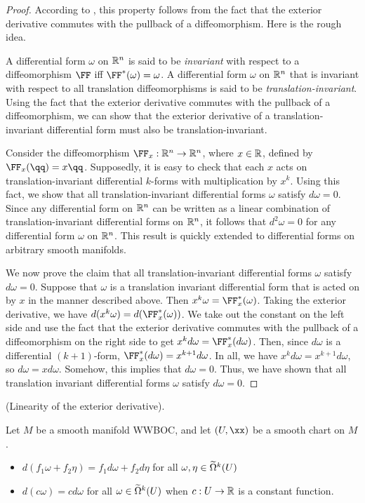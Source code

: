 \begin{proof}
    According to \cite{StackExchangePullbackImpliesdd0}, this property follows from the fact that the exterior derivative commutes with the pullback of a diffeomorphism. Here is the rough idea.
    
    A differential form $\omega$ on $\mathbb{R}^n$ is said to be \textit{invariant} with respect to a diffeomorphism $\FF$ iff $\FF^*(\omega) = \omega$. A differential form $\omega$ on $\mathbb{R}^n$ that is invariant with respect to all translation diffeomorphisms is said to be \textit{translation-invariant}. Using the fact that the exterior derivative commutes with the pullback of a diffeomorphism, we can show that the exterior derivative of a translation-invariant differential form must also be translation-invariant.
    
    Consider the diffeomorphism $\FF_x:\R^n \rightarrow \R^n$, where $x \in \mathbb{R}$, defined by $\FF_x(\qq) = x\qq$. Supposedly, it is easy to check that each $x$ acts on translation-invariant differential $k$-forms with multiplication by $x^k$. Using this fact, we show that all translation-invariant differential forms $\omega$ satisfy $d \omega = 0$. Since any differential form on $\mathbb{R}^n$ can be written as a linear combination of translation-invariant differential forms on $\mathbb{R}^n$, it follows that $d^2 \omega = 0$ for any differential form $\omega$ on $\mathbb{R}^n$. This result is quickly extended to differential forms on arbitrary smooth manifolds.
    
    We now prove the claim that all translation-invariant differential forms $\omega$ satisfy $d \omega = 0$. Suppose that $\omega$ is a translation invariant differential form that is acted on by $x$ in the manner described above. Then $x^k \omega = \FF_x^*(\omega)$. Taking the exterior derivative, we have $d(x^k \omega) = d(\FF_x^*(\omega))$. We take out the constant on the left side and use the fact that the exterior derivative commutes with the pullback of a diffeomorphism on the right side to get $x^k d\omega = \FF_x^*(d\omega)$. Then, since $d\omega$ is a differential $(k + 1)$-form, $\FF_x^*(d\omega) = x^{k + 1} d\omega$. In all, we have $x^k d\omega = x^{k + 1} d \omega$, so $d\omega = xd\omega$. Somehow, this implies that $d \omega = 0$. Thus, we have shown that all translation invariant differential forms $\omega$ satisfy $d \omega = 0$. 
\end{proof}

\newpage

\begin{theorem}
     (Linearity of the exterior derivative).
    
    Let $M$ be a smooth manifold WWBOC, and let $(U, \xx)$ be a smooth chart on $M$.
    
    \begin{itemize}
        \item $d(f_1 \omega + f_2 \eta) = f_1 d \omega + f_2 d \eta$ for all $\omega, \eta \in \widetilde{\Omega}^k(U)$
        \item $d(c \omega) = cd\omega$ for all $\omega \in \widetilde{\Omega}^k(U)$ when $c:U \rightarrow \mathbb{R}$ is a constant function.
    \end{itemize}
\end{theorem}

